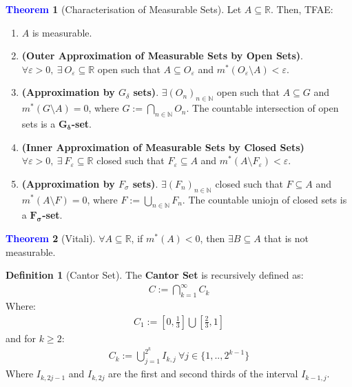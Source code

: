 \documentclass[reqno,11pt]{amsart}
\theoremstyle{definition}
\newtheorem{question}{Question}
\newcommand{\bb}[1]{\mathbb{#1}}
\newtheorem{theorem}{\textcolor{blue}{Theorem}}
\theoremstyle{definition}
\newtheorem{definition}{\textcolor{OliveGreen}{Definition}}
\theoremstyle{remark}
\begin{document}
\begin{theorem}[Characterisation of Measurable Sets] 
	Let $A \subseteq \bb{R}$. Then, TFAE: 
	\begin{enumerate}[nolistsep]
		\item $A$ is measurable. 
		\item \textbf{(Outer Approximation of Measurable Sets by Open Sets)}. $\forall \varepsilon > 0,\ \exists\ O_\varepsilon \subseteq \bb{R}$ open such that $A \subseteq O_\varepsilon$ and $m^*(O_\varepsilon \setminus A) < \varepsilon$. 
		\item \textbf{(Approximation by $G_\delta$ sets)}. $\exists (O_n)_{n \in \bb{N}}$ open such that $A \subseteq G$ and $m^*(G \setminus A) = 0$, where $G:= \bigcap_{n \in \bb{N}} O_n$. The countable intersection of open sets is a $\mathbf{G_\delta}$\textbf{-set}. 
		\item \textbf{(Inner Approximation of Measurable Sets by Closed Sets)} $\forall \varepsilon > 0,\ \exists\ F_\varepsilon \subseteq \bb{R}$ closed such that $F_\varepsilon \subseteq A$ and $m^*(A \setminus F_\varepsilon) < \varepsilon$. 
		\item \textbf{(Approximation by $F_\sigma$ sets)}. $\exists (F_n)_{n \in \bb{N}}$ closed such that $F \subseteq A$ and $m^*(A \setminus F) = 0$, where $F:= \bigcup_{n \in \bb{N}} F_n$. The countable uniojn of closed sets is a $\mathbf{F_\sigma}$\textbf{-set}. 

	\end{enumerate}
\end{theorem}


\begin{theorem}[Vitali]
	$\forall A \subseteq \bb{R}$, if $m^*(A) < 0$, then $\exists B \subseteq A$ that is not measurable. 
\end{theorem}

\begin{definition}[Cantor Set]
	The \textbf{Cantor Set} is recursively defined as: 
	\begin{align}
		C := \bigcap_{k=1}^\infty C_k 
	\end{align}
	Where: 
	\begin{align*}
		C_1:= \left[ 0, \frac{1}{3}	\right] \bigcup \left[ 	\frac{2}{3}, 1 \right]
	\end{align*}
	and for $k \geq 2 $: 
	\begin{align*}
		C_k := \bigcup_{j=1}^{2^k} I_{k, j}\ \forall j \in \{ 1, .., 2^{k-1} \} 	
	\end{align*}
	Where $I_{k, 2j-1}$ and $I_{k, 2j}$ are the first and second thirds of the interval $I_{k-1, j}$. 

\end{definition}
\end{document}
